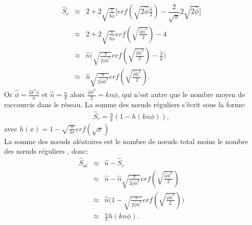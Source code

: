 \begin{eqnarray}\nonumber
\hat{S}_r&\approx&2+ 2\sqrt{\frac{\pi}{8\hat{\phi}}}\Big[erf(\sqrt{2\hat{\phi}}\frac{\hat{n}}{2})-\dfrac{2}{\sqrt{\pi}}2\sqrt{2\hat{\phi}}\Big] \\\nonumber
&\approx& 2+2\sqrt{\frac{\pi}{8\hat{\phi}}}erf(\sqrt{\frac{\hat{\phi}\hat{n}^2}{2}})-4  \\\nonumber
&\approx& \hat{n}\Big(\sqrt{\frac{\pi}{2\hat{\phi}\hat{n}^2}}erf(\sqrt{\frac{\hat{\phi}\hat{n}^2}{2}})-\frac{2}{\hat{n}}\Big)  \\
&\approx& \hat{n}\sqrt{\frac{\pi}{2\hat{\phi}\hat{n}^2}}erf(\sqrt{\frac{\hat{\phi}\hat{n}^2}{2}}).
\end{eqnarray}
Or $\hat{\phi}=\frac{2k^3\phi}{n}$ et $\hat{n}=\frac{n}{k}$ alors $\frac{\hat{\phi}\hat{n}^2}{2}=kn\phi$, qui n'est autre que le
nombre moyen de raccourcis dans le réseau. La somme des nœuds réguliers s'écrit sous la forme:
\begin{eqnarray}
\hat{S}_r=\frac{n}{k}(1-h(kn\phi)),
\end{eqnarray}
avec $h(x)=1-\sqrt{\frac{\pi}{4x}}erf(\sqrt{x})$\\
La somme des nœuds aléatoires est le nombre de nœuds total moins le nombre des nœuds réguliers , donc:
\begin{eqnarray}\nonumber
\hat{S}_{al}&\approx&\hat{n}-\hat{S}_r\\\nonumber
&\approx& \hat{n}-\hat{n}\sqrt{\frac{\pi}{2\hat{\phi}\hat{n}^2}}erf(\sqrt{\frac{\hat{\phi}\hat{n}^2}{2}})  \\\nonumber
&\approx& \hat{n}\Big(1-\sqrt{\frac{\pi}{2\hat{\phi}\hat{n}^2}}erf(\sqrt{\frac{\hat{\phi}\hat{n}^2}{2}})\Big)  \\
&\approx& \frac{n}{k}h(kn\phi).
\end{eqnarray}
